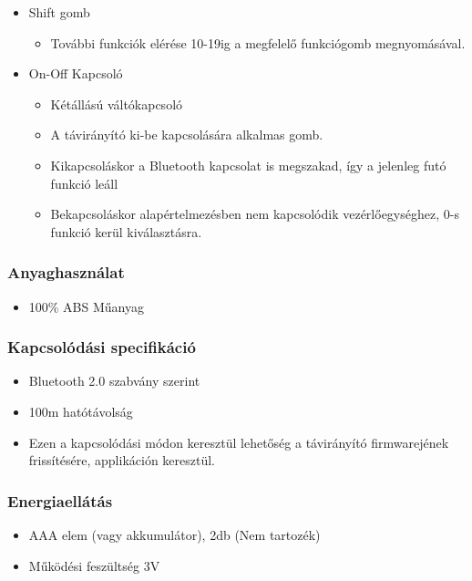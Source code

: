 \documentclass{article}
\begin{document}
\begin{itemize}
    \item Shift gomb
    \begin{itemize}
        \item További funkciók elérése 10-19ig a megfelelő funkciógomb megnyomásával. 
    \end{itemize}
    
    \item On-Off Kapcsoló
    \begin{itemize}
        \item Kétállású váltókapcsoló
        \item A távirányító ki-be kapcsolására alkalmas gomb.
        \item Kikapcsoláskor a Bluetooth kapcsolat is megszakad, így a jelenleg futó funkció leáll
        \item Bekapcsoláskor alapértelmezésben nem kapcsolódik vezérlőegységhez, 0-s funkció kerül kiválasztásra.

    \end{itemize}
    
\end{itemize}

\subsubsection{Anyaghasználat}
    \begin{itemize}
        \item 100\% ABS Műanyag
    \end{itemize}


\subsubsection{Kapcsolódási specifikáció}
\begin{itemize}
    \item Bluetooth 2.0 szabvány szerint
    \item 100m hatótávolság
    \item Ezen a kapcsolódási módon keresztül lehetőség a távirányító firmwarejének frissítésére, applikáción keresztül.
\end{itemize}

\subsubsection{Energiaellátás}
\begin{itemize}
    \item AAA elem (vagy akkumulátor), 2db (Nem tartozék)
    \item Működési feszültség 3V
\end{itemize}
\end{document}
